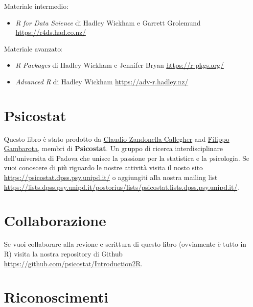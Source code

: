 \documentclass[
]{book}
\providecommand{\tightlist}{%
  \setlength{\itemsep}{0pt}\setlength{\parskip}{0pt}}
\begin{document}
Materiale intermedio:

\begin{itemize}
\tightlist
\item
  \emph{R for Data Science} di Hadley Wickham e Garrett Grolemund \url{https://r4ds.had.co.nz/}
\end{itemize}

Materiale avanzato:

\begin{itemize}
\tightlist
\item
  \emph{R Packages} di Hadley Wickham e Jennifer Bryan \url{https://r-pkgs.org/}
\item
  \emph{Advanced R} di Hadley Wickham \url{https://adv-r.hadley.nz/}
\end{itemize}

\hypertarget{psicostat}{%
\section*{Psicostat}\label{psicostat}}

Questo libro è stato prodotto da \href{https://claudiozandonella.netlify.app/}{Claudio Zandonella Callegher} and \href{https://filippogambarota.netlify.app/}{Filippo Gambarota}, membri di \textbf{Psicostat}. Un gruppo di ricerca interdisciplinare dell'universita di Padova che unisce la passione per la statistica e la psicologia. Se vuoi conoscere di più riguardo le nostre attività visita il nosto sito \url{https://psicostat.dpss.psy.unipd.it/} o aggiungiti alla nostra mailing list \url{https://lists.dpss.psy.unipd.it/postorius/lists/psicostat.lists.dpss.psy.unipd.it/}.

\hypertarget{collaborazione}{%
\section*{Collaborazione}\label{collaborazione}}

Se vuoi collaborare alla revione e scrittura di questo libro (ovviamente è tutto in R) visita la nostra repository di Github \url{https://github.com/psicostat/Introduction2R}.

\hypertarget{riconoscimenti}{%
\section*{Riconoscimenti}\label{riconoscimenti}}
\end{document}
